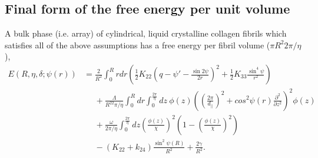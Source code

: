 \documentclass[12pt]{article}
\begin{document}
\subsection{Final form of the free energy per unit volume}
A bulk phase (i.e. array) of cylindrical, liquid crystalline collagen fibrils which satisfies all of the above assumptions has a free energy per fibril volume ($\pi R^2 2\pi/\eta$),
\begin{align}
E(R,\eta,\delta;\psi(r))&=\frac{2}{R^2}\int_0^{R}rdr\left(\frac{1}{2}K_{22}\left(q-\psi'-\frac{\sin2\psi}{2r}\right)^2+\frac{1}{2}K_{33}\frac{\sin^4\psi}{r^2}\right)\nonumber\\
&\phantom{=}+\frac{\Lambda}{R^22\pi/\eta}\int_0^Rdr\int_0^{\frac{2\pi}{\eta}}dz\:\phi(z)\left(\left(\frac{2\pi}{d_{\parallel}}\right)^2+cos^2\psi(r)\frac{\partial^2}{\partial z^2}\right)^2\!\!\phi(z)\nonumber\\
&\phantom{=}+\frac{\omega}{2\pi/\eta}\int_0^{\frac{2\pi}{\eta}}dz\left(\frac{\phi(z)}{\chi}\right)^2\left(1-\left(\frac{\phi(z)}{\chi}\right)^2\right)\nonumber\\
&\phantom{=}-(K_{22}+k_{24})\frac{\sin^2\psi(R)}{R^2}+\frac{2\gamma}{R^2}.
\end{align}



	
\clearpage


\end{document}
